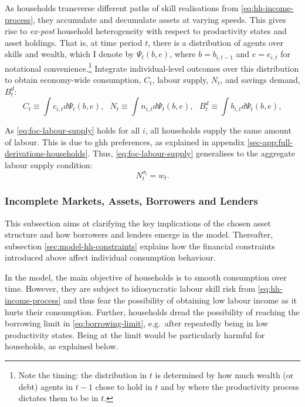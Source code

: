\documentclass[a4paper,12pt]{article} %
\numberwithin{equation}{section} %
\numberwithin{figure}{section}
\numberwithin{table}{section}
\begin{document}
As households transverse different paths of skill realisations from \eqref{eq:hh-income-process}, they accumulate and decumulate assets at varying speeds. This gives rise to \textit{ex-post} household heterogeneity with respect to productivity states and asset holdings. That is, at time period $t$, there is a distribution of agents over skills and wealth, which I denote by $\Psi_t (b,e)$, where $b=b_{i,t-1}$ and $e=e_{i,t}$ for notational convenience.\footnote{Note the timing: the distribution in $t$ is determined by how much wealth (or debt) agents in $t-1$ chose to hold in $t$ and by where the productivity process dictates them to be in $t$.} Integrate individual-level outcomes over this distribution to obtain economy-wide consumption, $C_t$, labour supply, $N_t$, and savings demand, $B_t^d$:
\begin{equation*}
    C_t \equiv \int c_{i,t} d \Psi_t (b,e), \ \ \ N_t \equiv \int n_{i,t} d \Psi_t (b,e), \ \ \ B_t^d \equiv \int b_{i,t} d \Psi_t (b,e),
\end{equation*}

As \eqref{eq:foc-labour-supply} holds for all $i$, all households supply the same amount of labour. This is due to \Gls{ghh} preferences, as explained in appendix \ref{sec-app:full-derivations-households}. Thus, \eqref{eq:foc-labour-supply} generalises to the aggregate labour supply condition:
\begin{equation}
    N_t^{\sigma_l} = w_t. \label{eq:hh-agg-labour-supply}
\end{equation}

\subsubsection{Incomplete Markets, Assets, Borrowers and Lenders}
\label{sec:model-hh-assets}

This subsection aims at clarifying the key implications of the chosen asset structure and how borrowers and lenders emerge in the model. Thereafter, subsection \ref{sec:model-hh-constraints} explains how the financial constraints introduced above affect individual consumption behaviour. 

In the model, the main objective of households is to smooth consumption over time. However, they are subject to idiosyncratic labour skill risk from \eqref{eq:hh-income-process} and thus fear the possibility of obtaining low labour income as it hurts their consumption. Further, households dread the possibility of reaching the borrowing limit in \eqref{eq:borrowing-limit}, e.g.~after repeatedly being in low productivity states. Being at the limit would be particularly harmful for households, as explained below.
\end{document}
